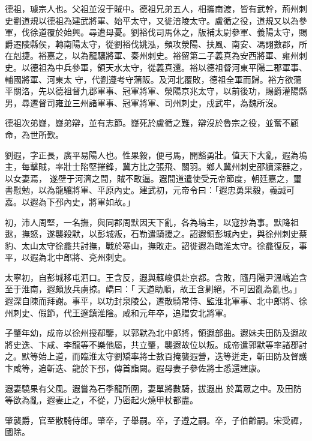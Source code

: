 \begin{pinyinscope}
 德祖，璩宗人也。父祖並沒于賊中。德祖兄弟五人，相攜南渡，皆有武幹，荊州刺史劉道規以德祖為建武將軍、始平太守，又徙涪陵太守。盧循之役，道規又以為參軍，伐徐道覆於始興。尋遭母憂。劉裕伐司馬休之，版補太尉參軍、義陽太守，賜爵遷陵縣侯，轉南陽太守，從劉裕伐姚泓，頻攻滎陽、扶風、南安、馮詡數郡，所在剋捷。裕嘉之，以為龍驤將軍、秦州刺史。裕留第二子義真為安西將軍、雍州刺史。以德祖為中兵參軍，領天水太守，從義真還。裕以德祖督河東平陽二郡軍事、輔國將軍、河東太
 守，代劉遵考守蒲阪。及河北覆敗，德祖全軍而歸。裕方欲蕩平關洛，先以德祖督九郡軍事、冠軍將軍、滎陽京兆太守，以前後功，賜爵灌陽縣男，尋遷督司雍並三州諸軍事、冠軍將軍、司州刺史，戍武牢，為魏所沒。



 德祖次弟嶷，嶷弟辯，並有志節。嶷死於盧循之難，辯沒於魯宗之役，並奮不顧命，為世所歎。



 劉遐，字正長，廣平易陽人也。性果毅，便弓馬，開豁勇壯。值天下大亂，遐為塢主，每擊賊，率壯士陷堅摧鋒，冀方比之張飛、關羽。鄉人冀州刺史邵續深器之，以女妻焉，
 遂壁于河濟之間，賊不敢逼。遐間道遣使受元帝節度，朝廷嘉之，璽書慰勉，以為龍驤將軍、平原內史。建武初，元帝令曰：「遐忠勇果毅，義誠可嘉。以遐為下邳內史，將軍如故。」



 初，沛人周堅，一名撫，與同郡周默因天下亂，各為塢主，以寇抄為事。默降祖逖，撫怒，遂襲殺默，以彭城叛，石勒遣騎援之。詔遐領彭城內史，與徐州刺史蔡豹、太山太守徐龕共討撫，戰於寒山，撫敗走。詔徙遐為臨淮太守。徐龕復反，事平，以遐為北中郎將、兗州刺史。



 太寧初，自彭城移屯泗口。王含反，遐與蘇峻俱赴京都。含敗，隨丹陽尹溫嶠追含至于淮南，遐頗放兵虜掠。嶠曰：「
 天道助順，故王含剿絕，不可因亂為亂也。」遐深自陳而拜謝。事平，以功封泉陵公，遷散騎常侍、監淮北軍事、北中郎將、徐州刺史、假節，代王邃鎮淮陰。咸和元年卒，追贈安北將軍。



 子肇年幼，成帝以徐州授郗鑒，以郭默為北中郎將，領遐部曲。遐妹夫田防及遐故將史迭、卞咸、李龍等不樂他屬，共立肇，襲遐故位以叛。成帝遣郭默等率諸郡討之。默等始上道，而臨淮太守劉矯率將士數百掩襲遐營，迭等迸走，斬田防及督護卞咸等，追斬迭、龍於下邳，傳首詣闕。遐母妻子參佐將士悉還建康。



 遐妻驍果有父風。遐嘗為石季龍所圍，妻單將數騎，拔遐出
 於萬眾之中。及田防等欲為亂，遐妻止之，不從，乃密起火燒甲杖都盡。



 肇襲爵，官至散騎侍郎。肇卒，子舉嗣。卒，子遵之嗣。卒，子伯齡嗣。宋受禪，國除。




\end{pinyinscope}
